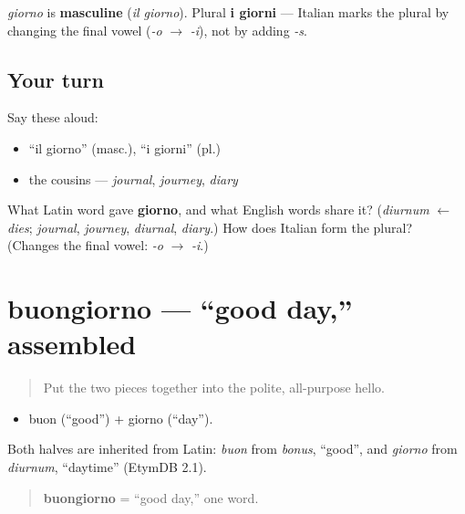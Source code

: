 \begin{grammarlens}[title={Grammar Lens: masculine, plural by vowel-change}]
\emph{giorno} is \textbf{masculine} (\emph{il giorno}). Plural \textbf{i giorni} — Italian marks the plural by changing the final vowel (\emph{-o} $\to$ \emph{-i}), not by adding \emph{-s}.
\end{grammarlens}

\subsection*{Your turn}
Say these aloud:

\begin{itemize}
\raggedright
  \item \textquotedblleft{}il giorno\textquotedblright{} (masc.), \textquotedblleft{}i giorni\textquotedblright{} (pl.)
  \item the cousins — \emph{journal}, \emph{journey}, \emph{diary}
\end{itemize}

\begin{tcolorbox}[breakable,colback=teal!4,colframe=teal!35!black,title={Before you move on}]
What Latin word gave \textbf{giorno}, and what English words share it? (\emph{diurnum} $\leftarrow$ \emph{dies}; \emph{journal}, \emph{journey}, \emph{diurnal}, \emph{diary}.) How does Italian form the plural? (Changes the final vowel: \emph{-o} $\to$ \emph{-i}.)
\end{tcolorbox}
\section[buongiorno]{buongiorno — \textquotedblleft{}good day,\textquotedblright{} assembled}

\label{lesson:IT-C01-buongiorno}



\begin{quote}
Put the two pieces together into the polite, all-purpose hello.
\end{quote}

\begin{cousinweb}
\begin{itemize}
\raggedright
  \item buon (\textquotedblleft{}good\textquotedblright{}) + giorno (\textquotedblleft{}day\textquotedblright{}).
\end{itemize}

Both halves are inherited from Latin: \emph{buon} from \emph{bonus}, \textquotedblleft{}good\textquotedblright{}, and \emph{giorno} from \emph{diurnum}, \textquotedblleft{}daytime\textquotedblright{} (EtymDB 2.1).

\begin{quote}
\textbf{buongiorno} = \textquotedblleft{}good day,\textquotedblright{} one word.
\end{quote}
\end{cousinweb}


